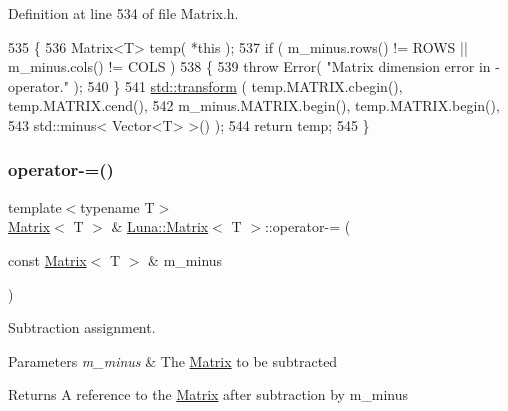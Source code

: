 Definition at line 534 of file Matrix.\+h.


\begin{DoxyCode}
535   \{
536     Matrix<T> temp( *\textcolor{keyword}{this} );
537     \textcolor{keywordflow}{if} ( m\_minus.rows() != ROWS || m\_minus.cols() != COLS )
538     \{
539       \textcolor{keywordflow}{throw} Error( \textcolor{stringliteral}{"Matrix dimension error in - operator."} );
540     \}
541     \hyperlink{namespaceHeat__plot_aeaa6785bedcad63b4bd40e8cb1bad8a0}{std::transform} ( temp.MATRIX.cbegin(), temp.MATRIX.cend(),
542                      m\_minus.MATRIX.begin(), temp.MATRIX.begin(),
543                      std::minus< Vector<T> >() );
544     \textcolor{keywordflow}{return} temp;
545   \}
\end{DoxyCode}
\mbox{\label{classLuna_1_1Matrix_a5df4cdac2f9b84bc178dcb3835e26031}} 
\subsubsection{\texorpdfstring{operator-\/=()}{operator-=()}\hspace{0.1cm}{\footnotesize\ttfamily [1/2]}}
{\footnotesize\ttfamily template$<$typename T$>$ \\
\hyperlink{classLuna_1_1Matrix}{Matrix}$<$ T $>$ \& \hyperlink{classLuna_1_1Matrix}{Luna\+::\+Matrix}$<$ T $>$\+::operator-\/= (\begin{DoxyParamCaption}\item[{const \hyperlink{classLuna_1_1Matrix}{Matrix}$<$ T $>$ \&}]{m\+\_\+minus }\end{DoxyParamCaption})\hspace{0.3cm}{\ttfamily [inline]}}



Subtraction assignment. 


\begin{DoxyParams}{Parameters}
{\em m\+\_\+minus} & The \hyperlink{classLuna_1_1Matrix}{Matrix} to be subtracted \\
\hline
\end{DoxyParams}
\begin{DoxyReturn}{Returns}
A reference to the \hyperlink{classLuna_1_1Matrix}{Matrix} after subtraction by m\+\_\+minus 
\end{DoxyReturn}


